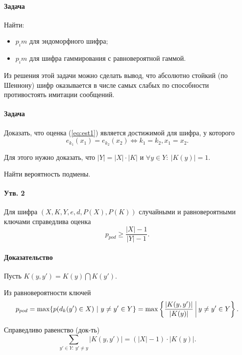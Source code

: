 \documentclass[a4paper,12pt]{article}
\newcommand{\refeq}[1]{(\ref{#1})}
\begin{document}
\paragraph{Задача}

Найти:
\begin{itemize}
	\item $p_im$ для эндоморфного шифра;
	\item $p_im$ для шифра гаммирования с равновероятной гаммой.
\end{itemize}

Из решения этой задачи можно сделать вывод, что абсолютно стойкий (по Шеннону) шифр оказывается в числе самых слабых по способности противостоять имитации
сообщений.

\paragraph{Задача}

Доказать, что оценка \refeq{eq:est1} является достижимой для шифра, у которого
$$
e_{k_1}(x_1) = e_{k_2}(x_2) \Leftrightarrow k_1 = k_2, x_1 = x_2.
$$

Для этого нужно доказать, что $|Y| = |X| \cdot |K|$ и $\forall y \in Y : ~|K(y)| = 1$.

Найти вероятность подмены.

\paragraph{Утв. 2}
Для шифра $(X,K,Y,e,d, P(X), P(K))$ случайными и равновероятными ключами справедлива оценка 
\begin{equation}
	p_{pod} \ge \frac{|X|-1}{|Y|-1}. \label{eq:est2}
\end{equation}

\paragraph{Доказательство}
Пусть $K(y,y') = K(y) \bigcap K(y').$

Из равновероятности ключей
\begin{equation}
	p_{pod} = \max \{p(d_k(y') \in X) ~|~ y \ne y' \in Y\} =\max \left\{ \frac{|K(y,y')|}{|K(y)|} ~\vline ~ y\ne y' \in Y \right\}. \label{eq:est3}
\end{equation}

Справедливо равенство (док-ть)
\begin{equation}
	\sum_{y' \in Y: ~ y' \ne y} |K(y, y')| = (|X| - 1) \cdot |K(y)|. \label{eq:est4}
\end{equation}
\end{document}
